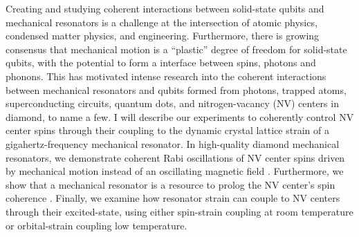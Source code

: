 Creating and studying coherent interactions between solid-state qubits and mechanical resonators is a challenge at the intersection of atomic physics, condensed matter physics, and engineering. Furthermore, there is growing consensus that mechanical motion is a “plastic” degree of freedom for solid-state qubits, with the potential to form a interface between spins, photons and phonons.  This has motivated intense research into the coherent interactions between mechanical resonators and qubits formed from photons, trapped atoms, superconducting circuits, quantum dots, and nitrogen-vacancy (NV) centers in diamond, to name a few.  I will describe our experiments to coherently control NV center spins through their coupling to the dynamic crystal lattice strain of a gigahertz-frequency mechanical resonator.  In high-quality diamond mechanical resonators, we demonstrate coherent Rabi oscillations of NV center spins driven by mechanical motion instead of an oscillating magnetic field \cite{MacQuarrie_2013,MacQuarrie_2015}. Furthermore, we show that a mechanical resonator is a resource to prolog the NV center’s spin coherence \cite{MacQuarrie_2015}.  Finally, we examine how resonator strain can couple to NV centers through their excited-state, using either spin-strain coupling at room temperature \cite{MacQuarrie_2017} or orbital-strain coupling low temperature.